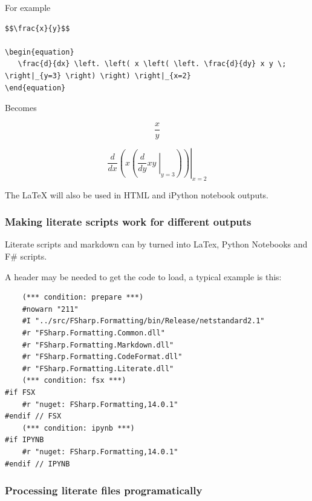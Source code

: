 \documentclass{article}
\begin{document}
For example
\begin{lstlisting}
$$\frac{x}{y}$$

\begin{equation}
   \frac{d}{dx} \left. \left( x \left( \left. \frac{d}{dy} x y \; \right|_{y=3} \right) \right) \right|_{x=2}
\end{equation}

\end{lstlisting}


Becomes


\begin{equation}
\frac{x}{y}
\end{equation}




\begin{equation}
   \frac{d}{dx} \left. \left( x \left( \left. \frac{d}{dy} x y \; \right|_{y=3} \right) \right) \right|_{x=2}
\end{equation}




The LaTeX will also be used in HTML and iPython notebook outputs.
\subsubsection*{Making literate scripts work for different outputs}



Literate scripts and markdown can by turned into LaTex, Python Notebooks and F\# scripts.


A header may be needed to get the code to load, a typical example is this:
\begin{lstlisting}
    (*** condition: prepare ***)
    #nowarn "211"
    #I "../src/FSharp.Formatting/bin/Release/netstandard2.1"
    #r "FSharp.Formatting.Common.dll"
    #r "FSharp.Formatting.Markdown.dll"
    #r "FSharp.Formatting.CodeFormat.dll"
    #r "FSharp.Formatting.Literate.dll"
    (*** condition: fsx ***)
#if FSX
    #r "nuget: FSharp.Formatting,14.0.1"
#endif // FSX
    (*** condition: ipynb ***)
#if IPYNB
    #r "nuget: FSharp.Formatting,14.0.1"
#endif // IPYNB

\end{lstlisting}
\subsubsection*{Processing literate files programatically}
\end{document}
